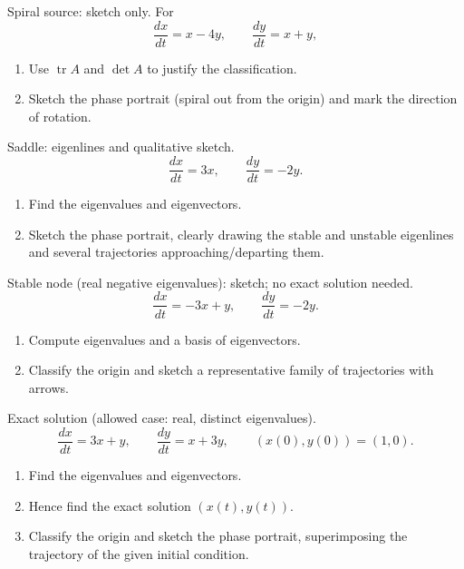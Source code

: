 \documentclass[11pt]{article}
\def\textbf#1{#1}%
\newcounter{question}
\begin{document}
\begin{question}
\textbf{Spiral source: sketch only.}
For
\[
\frac{dx}{dt}=x-4y,\qquad \frac{dy}{dt}=x+y,
\]
\begin{enumerate}
  \item Use $\operatorname{tr}A$ and $\det A$ to justify the classification.
  \item Sketch the phase portrait (spiral out from the origin) and mark the direction of rotation.
\end{enumerate}
\end{question}

\begin{question}
\textbf{Saddle: eigenlines and qualitative sketch.}
\[
\frac{dx}{dt}=3x,\qquad \frac{dy}{dt}=-2y.
\]
\begin{enumerate}
  \item Find the eigenvalues and eigenvectors.
  \item Sketch the phase portrait, clearly drawing the stable and unstable eigenlines and several trajectories approaching/departing them.
\end{enumerate}
\end{question}

\begin{question}
\textbf{Stable node (real negative eigenvalues): sketch; no exact solution needed.}
\[
\frac{dx}{dt}=-3x+y,\qquad \frac{dy}{dt}=-2y.
\]
\begin{enumerate}
  \item Compute eigenvalues and a basis of eigenvectors.
  \item Classify the origin and sketch a representative family of trajectories with arrows.
\end{enumerate}
\end{question}

\begin{question}
\textbf{Exact solution (allowed case: real, distinct eigenvalues).}
\[
\frac{dx}{dt}=3x+y,\qquad \frac{dy}{dt}=x+3y,\qquad (x(0),y(0))=(1,0).
\]
\begin{enumerate}
  \item Find the eigenvalues and eigenvectors.
  \item Hence find the exact solution $(x(t),y(t))$.
  \item Classify the origin and sketch the phase portrait, superimposing the trajectory of the given initial condition.
\end{enumerate}
\end{question}
\end{document}
